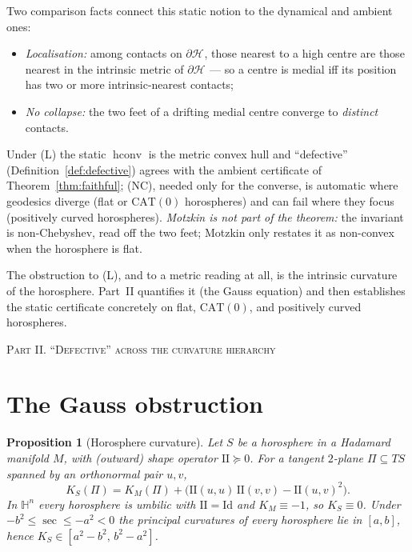 \documentclass[11pt]{article}
\newtheorem{proposition}[theorem]{Proposition}
\theoremstyle{remark}
\newcommand{\Hb}[1]{\mathcal{H}_{#1}}
\newcommand{\hconv}{\operatorname{hconv}}
\newcommand{\HH}{\mathbb{H}}
\begin{document}
Two comparison facts connect this static notion to the dynamical and
ambient ones:
\begin{itemize}
\item[\textup{(L)}] \emph{Localisation:} among contacts on
$\partial\Hb{}$, those nearest to a high centre are those nearest in
the intrinsic metric of $\partial\Hb{}$ --- so a centre is medial iff
its position has two or more intrinsic-nearest contacts;
\item[\textup{(NC)}] \emph{No collapse:} the two feet of a drifting
medial centre converge to \emph{distinct} contacts.
\end{itemize}
Under (L) the static $\hconv$ is the metric convex hull and
``defective'' (Definition~\ref{def:defective}) agrees with the
ambient certificate of Theorem~\ref{thm:faithful}; (NC), needed only
for the converse, is automatic where geodesics diverge (flat or
$\mathrm{CAT}(0)$ horospheres) and can fail where they focus
(positively curved horospheres). \emph{Motzkin is not part of the
theorem:} the invariant is non-Chebyshev, read off the two feet;
Motzkin only restates it as non-convex when the horosphere is flat.

The obstruction to (L), and to a metric reading at all, is the
intrinsic curvature of the horosphere. Part~II quantifies it (the Gauss
equation) and then establishes the static certificate concretely on
flat, $\mathrm{CAT}(0)$, and positively curved horospheres.

\bigskip
\begin{center}\textsc{Part II. ``Defective'' across the curvature
hierarchy}\end{center}

\section{The Gauss obstruction}\label{sec:gauss}

\begin{proposition}[Horosphere curvature]\label{prop:gauss}
Let $S$ be a horosphere in a Hadamard manifold $M$, with (outward)
shape operator $\mathrm{II}\succeq0$. For a tangent $2$-plane
$\Pi\subseteq T S$ spanned by an orthonormal pair $u,v$,
\[
  K_{S}(\Pi)=K_{M}(\Pi)
  +\bigl(\mathrm{II}(u,u)\,\mathrm{II}(v,v)-\mathrm{II}(u,v)^{2}\bigr).
\]
In $\HH^{n}$ every horosphere is umbilic with $\mathrm{II}=\mathrm{Id}$
and $K_{M}\equiv-1$, so $K_{S}\equiv0$. Under
$-b^{2}\le\sec\le-a^{2}<0$ the principal curvatures of every horosphere
lie in $[a,b]$, hence $K_{S}\in[a^{2}-b^{2},\,b^{2}-a^{2}]$.
\end{proposition}
\end{document}
